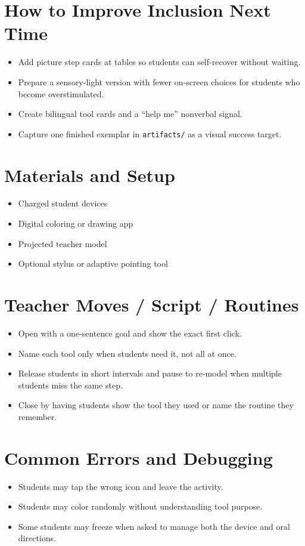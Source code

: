 \documentclass[11pt]{article}
\begin{document}
\section*{How to Improve Inclusion Next Time}
\begin{itemize}[leftmargin=*]
\item Add picture step cards at tables so students can self-recover without waiting.
\item Prepare a sensory-light version with fewer on-screen choices for students who become overstimulated.
\item Create bilingual tool cards and a “help me” nonverbal signal.
\item Capture one finished exemplar in \texttt{artifacts/} as a visual success target.
\end{itemize}

\section*{Materials and Setup}
\begin{itemize}[leftmargin=*]
\item Charged student devices
\item Digital coloring or drawing app
\item Projected teacher model
\item Optional stylus or adaptive pointing tool
\end{itemize}

\section*{Teacher Moves / Script / Routines}
\begin{itemize}[leftmargin=*]
\item Open with a one-sentence goal and show the exact first click.
\item Name each tool only when students need it, not all at once.
\item Release students in short intervals and pause to re-model when multiple students miss the same step.
\item Close by having students show the tool they used or name the routine they remember.
\end{itemize}

\section*{Common Errors and Debugging}
\begin{itemize}[leftmargin=*]
\item Students may tap the wrong icon and leave the activity.
\item Students may color randomly without understanding tool purpose.
\item Some students may freeze when asked to manage both the device and oral directions.
\end{itemize}
\end{document}
